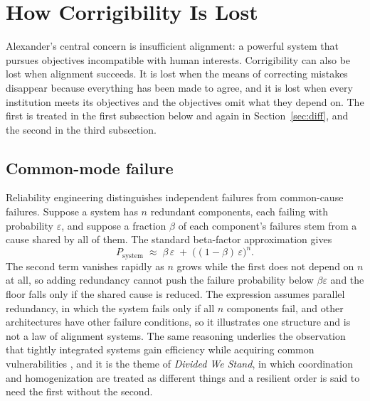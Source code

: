 \documentclass[11pt]{article}
\begin{document}
\section{How Corrigibility Is Lost}\label{sec:homog}

Alexander's central concern is insufficient alignment: a powerful system that pursues objectives incompatible with human interests. Corrigibility can also be lost when alignment succeeds. It is lost when the means of correcting mistakes disappear because everything has been made to agree, and it is lost when every institution meets its objectives and the objectives omit what they depend on. The first is treated in the first subsection below and again in Section~\ref{sec:diff}, and the second in the third subsection.

\subsection{Common-mode failure}

Reliability engineering distinguishes independent failures from common-cause failures. Suppose a system has $n$ redundant components, each failing with probability $\varepsilon$, and suppose a fraction $\beta$ of each component's failures stem from a cause shared by all of them. The standard beta-factor approximation gives
\[
P_{\text{system}} \;\approx\; \beta\,\varepsilon \;+\; \bigl((1-\beta)\,\varepsilon\bigr)^{n}.
\]
The second term vanishes rapidly as $n$ grows while the first does not depend on $n$ at all, so adding redundancy cannot push the failure probability below $\beta\varepsilon$ and the floor falls only if the shared cause is reduced. The expression assumes parallel redundancy, in which the system fails only if all $n$ components fail, and other architectures have other failure conditions, so it illustrates one structure and is not a law of alignment systems. The same reasoning underlies the observation that tightly integrated systems gain efficiency while acquiring common vulnerabilities \cite{friedman2005,perrow1984}, and it is the theme of \emph{Divided We Stand}, in which coordination and homogenization are treated as different things and a resilient order is said to need the first without the second.
\end{document}
